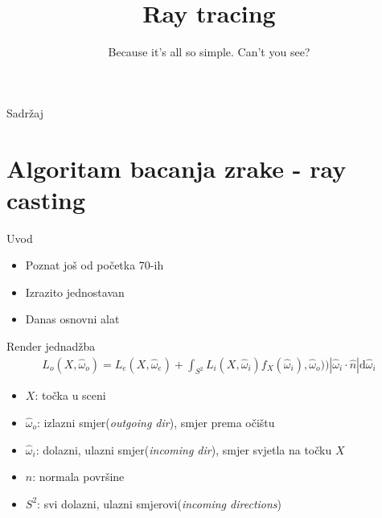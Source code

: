 \documentclass[9pt]{beamer}
\title{Ray tracing}
\subtitle{Because it's all so simple. Can't you see?}
\institute{Računalna grafika}
\begin{document}
\begin{frame}
 \titlepage
\end{frame}

\begin{frame}{Sadržaj}
  \tableofcontents
\end{frame}


\section{Algoritam bacanja zrake - ray casting}
\begin{frame}{Uvod}
\begin{itemize}
	\item Poznat još od početka 70-ih
	\item Izrazito jednostavan
	\item Danas osnovni alat
\end{itemize}
\end{frame}

\begin{frame}{Render jednadžba}
	\begin{align*}
	L_o(X, \hat{\omega}_o) = L_e(X, \hat{\omega}_e) +
	 \int_{S^2}  L_i(X, \hat{\omega}_i) f_X(\hat{\omega}_i), \hat{\omega}_o)) \left|\hat{\omega}_i\cdot \hat{n}\right| 
	 \mathrm{d} \hat{\omega}_i
	\end{align*}
	\begin{itemize}
		\item $X$: točka u sceni
		\item $\hat{\omega}_o$: izlazni smjer(\textit{outgoing dir}), smjer prema očištu
		\item $\hat{\omega}_i$: dolazni, ulazni smjer(\textit{incoming dir}), smjer svjetla na točku $X$ 
    	\item $\hat{n}$: normala površine
		\item $S^2$: svi dolazni, ulazni smjerovi(\textit{incoming directions})
	\end{itemize}
\end{frame}
\end{document}
